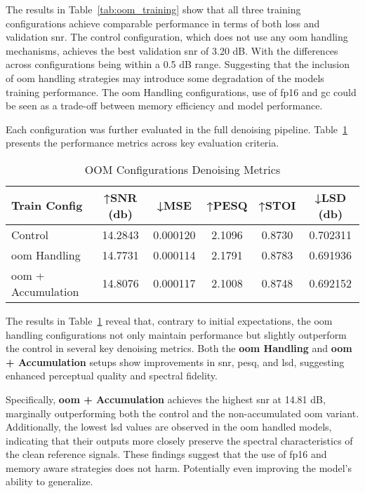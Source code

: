 The results in Table~\ref{tab:oom_training} show that all three training configurations achieve comparable performance in terms of both loss and validation \gls{snr}. The control configuration, which does not use any \gls{oom} handling mechanisms, achieves the best validation \gls{snr} of 3.20 dB. With the differences across configurations being within a 0.5 dB range. Suggesting that the inclusion of \gls{oom} handling strategies may introduce some degradation of the models training performance. The \gls{oom} Handling configurations, use of \gls{fp16} and \gls{gc} could be seen as a trade-off between memory efficiency and model performance. 

Each configuration was further evaluated in the full denoising pipeline. Table~\ref{tab:oom_metrics} presents the performance metrics across key evaluation criteria.

\vspace{1em}
\begin{table}[H]
\centering
\caption{OOM Configurations Denoising Metrics}
\label{tab:oom_metrics}
\begin{tabular}{|l|c|c|c|c|c|}
\hline
\textbf{Train Config} & \textbf{↑SNR (db)} & \textbf{↓MSE} & \textbf{↑PESQ} & \textbf{↑STOI} & \textbf{↓LSD (db)} \\
\hline
Control                    & 14.2843 & 0.000120 & 2.1096 & 0.8730 & 0.702311 \\
\gls{oom} Handling         & 14.7731 & 0.000114 & 2.1791 & 0.8783 & 0.691936 \\
\gls{oom} + Accumulation   & 14.8076 & 0.000117 & 2.1008 & 0.8748 & 0.692152 \\
\hline
\end{tabular}
\end{table}

The results in Table~\ref{tab:oom_metrics} reveal that, contrary to initial expectations, the \gls{oom} handling configurations not only maintain performance but slightly outperform the control in several key denoising metrics. Both the \textbf{\gls{oom} Handling} and \textbf{\gls{oom} + Accumulation} setups show improvements in \gls{snr}, \gls{pesq}, and \gls{lsd}, suggesting enhanced perceptual quality and spectral fidelity.

Specifically, \textbf{\gls{oom} + Accumulation} achieves the highest \gls{snr} at 14.81 dB, marginally outperforming both the control and the non-accumulated \gls{oom} variant. Additionally, the lowest \gls{lsd} values are observed in the \gls{oom} handled models, indicating that their outputs more closely preserve the spectral characteristics of the clean reference signals. These findings suggest that the use of \gls{fp16} and memory aware strategies does not harm. Potentially even improving the model's ability to generalize. 

